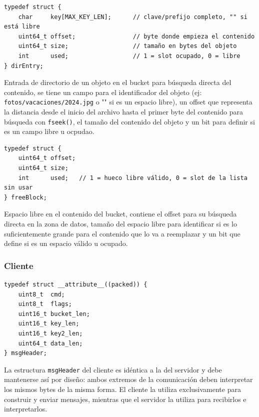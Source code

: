 \documentclass[12pt, letterpaper]{article}
\begin{document}
\begin{lstlisting}
typedef struct {
    char     key[MAX_KEY_LEN];      // clave/prefijo completo, "" si está libre
    uint64_t offset;                // byte donde empieza el contenido
    uint64_t size;                  // tamaño en bytes del objeto
    int      used;                  // 1 = slot ocupado, 0 = libre
} dirEntry;
\end{lstlisting}
Entrada de directorio de un objeto en el bucket para búsqueda directa del contenido, se tiene un campo para el identificador del objeto (ej: \texttt{fotos/vacaciones/2024.jpg} o "" si es un espacio libre), un offset que representa la distancia desde el inicio del archivo hasta el primer byte del contenido para búsqueda con \texttt{fseek()}, el tamaño del contenido del objeto y un bit para definir si es un campo libre u ocpudao. \\

\begin{lstlisting}
typedef struct {
    uint64_t offset;
    uint64_t size;
    int      used;   // 1 = hueco libre válido, 0 = slot de la lista sin usar
} freeBlock;
\end{lstlisting}
Espacio libre en el contenido del bucket, contiene el offset para su búsqueda directa en la zona de datos, tamaño del espacio libre para identificar si es lo suficientemente grande para el contenido que lo va a reemplazar y un bit que define si es un espacio válido u ocupado.

\subsubsection{Cliente}
\begin{lstlisting}
typedef struct __attribute__((packed)) {
    uint8_t  cmd;
    uint8_t  flags;
    uint16_t bucket_len;
    uint16_t key_len;
    uint16_t key2_len;
    uint64_t data_len;
} msgHeader;
\end{lstlisting}
La estructura \texttt{msgHeader} del cliente es idéntica a la del servidor 
y debe mantenerse así por diseño: ambos extremos de la comunicación deben 
interpretar los mismos bytes de la misma forma. El cliente la utiliza 
exclusivamente para construir y enviar mensajes, mientras que el servidor 
la utiliza para recibirlos e interpretarlos.
\end{document}
